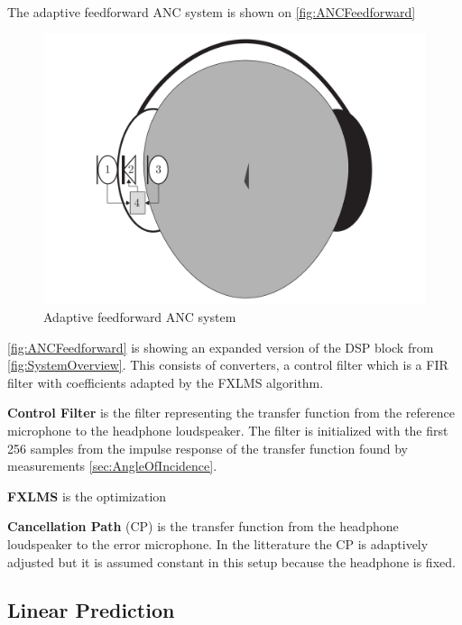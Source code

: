 The adaptive feedforward ANC system is shown on \autoref{fig:ANCFeedforward}
\begin{figure}[H]
	\centering
	\includegraphics[width=1\columnwidth]{figures/ArticleIllustrations/SystemOverview}
	\caption{Adaptive feedforward ANC system}
	\label{fig:ANCFeedforward}
\end{figure}
\autoref{fig:ANCFeedforward} is showing an expanded version of the DSP block from \autoref{fig:SystemOverview}. This consists of converters, a control filter which is a FIR filter with coefficients adapted by the FXLMS algorithm. 

\textbf{Control Filter} is the filter representing the transfer function from the reference microphone to the headphone loudspeaker. The filter is initialized with the first 256 samples from the impulse response of the transfer function found by measurements \autoref{sec:AngleOfIncidence}.  

\textbf{FXLMS} is the optimization

\textbf{Cancellation Path} (CP) is the transfer function from the headphone loudspeaker to the error microphone. In the litterature \cite{Hansen} the CP is adaptively adjusted but it is assumed constant in this setup because the headphone is fixed.     



\subsection*{Linear Prediction}